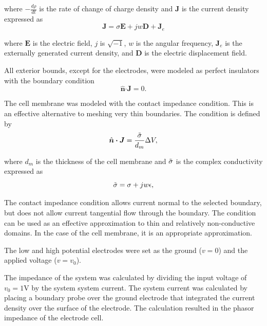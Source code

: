 where $-\frac{d\rho}{dt}$ is the rate of change of charge density and $\boldsymbol J$ is the current density expressed as
\begin{equation}
    \boldsymbol J = \sigma\boldsymbol E + jw\boldsymbol D + \boldsymbol J_e
\end{equation}

where $\boldsymbol E$ is the electric field, $j$ is $\sqrt{-1}$, $w$ is the angular frequency, $\boldsymbol J_e$ is the externally generated current density, and $\boldsymbol D$ is the electric displacement field. 

\par All exterior bounds, except for the electrodes, were modeled as perfect insulators with the boundary condition
\begin{equation}
    \hat{\boldsymbol n} \boldsymbol\cdot \boldsymbol J = 0.
\end{equation}

\par The cell membrane was modeled with the contact impedance condition. This is an effective alternative to meshing very thin boundaries. The condition is defined by
\begin{equation}
    \hat{\boldsymbol n} \boldsymbol\cdot \boldsymbol J = \frac{\Tilde{\sigma}}{d_{m}} \Delta V,
\end{equation}

where $d_m$ is the thickness of the cell membrane and $\Tilde{\sigma}$ is the complex conductivity expressed as
\begin{equation}
    \Tilde{\sigma} = \sigma + jw\epsilon ,
\end{equation}

\par The contact impedance condition allows current normal to the selected boundary, but does not allow current tangential flow through the boundary. The condition can be used as an effective approximation to thin and relatively non-conductive domains. In the case of the cell membrane, it is an appropriate approximation. 

\par The low and high potential electrodes were set as the ground ($v=0$) and the applied voltage ($v=v_0$).

\par The impedance of the system was calculated by dividing the input voltage of $v_0 = 1$V by the system system current. The system current was calculated by placing a boundary probe over the ground electrode that integrated the current density over the surface of the electrode. The calculation resulted in the phasor impedance of the electrode cell. 

